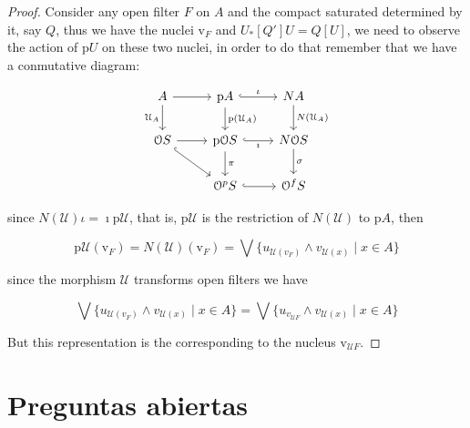 \documentclass[11pt]{amsart}
\theoremstyle{plain}
\theoremstyle{definition}
\begin{document}
\begin{proof}
Consider any open filter $F$ on $A$ and the compact saturated determined by it, say $Q$, 
thus we have the nuclei $\mathrm{v}_{F}$ and $U_{*}[Q']U=Q[U]$, we need to observe the action of 
$\mathrm{p}U$ on these two nuclei, in order to do that remember that we have a conmutative diagram:



\[\begin{tikzcd}
	A & \mathrm{p}A & NA \\
	{\mathcal{O}S} & {\mathrm{p}
	\mathcal{O}S} & {N\mathcal{O}S} \\
	& {\mathcal{O}^pS} & {\mathcal{O}^fS}
	\arrow[from=1-1, to=1-2]
	\arrow["{\mathcal{U}_A}"', from=1-1, to=2-1]
	\arrow["\iota",hook, from=1-2, to=1-3]
	\arrow["{\mathrm{p}(\mathcal{U}_A)}", from=1-2, to=2-2]
	\arrow["{N(\mathcal{U}_A)}", from=1-3, to=2-3]
	\arrow[from=2-1, to=2-2]
	\arrow[hook, from=2-1, to=3-2]
	\arrow["\imath "',hook, from=2-2, to=2-3]
	\arrow["\pi", from=2-2, to=3-2]
	\arrow["\sigma", from=2-3, to=3-3]
	\arrow[hook, from=3-2, to=3-3]
\end{tikzcd}\]

since $N(\mathcal{U})\iota=\imath\mathrm{p}\mathcal{U}$, that is, $\mathrm{p}\mathcal{U}$ 
is the restriction of $N(\mathcal{U})$ to $\mathrm{p}A$, then 

\[\mathrm{p}\mathcal{U}(\mathrm{v}_{F})=N(\mathcal{U})(\mathrm{v}_{F})=\bigvee\{u_{\mathcal{U}(v_{F})}\wedge v_{\mathcal{U}(x)}\mid x\in A \}\]

since the morphism $\mathcal{U}$ transforms open filters we have 



\[\bigvee\{u_{\mathcal{U}(v_{F})}\wedge v_{\mathcal{U}(x)}\mid x\in A \}=\bigvee\{u_{v_{\mathcal{U}F}}\wedge v_{\mathcal{U}(x)}\mid x\in A \}\]


But this representation is the corresponding to the nucleus $\mathrm{v}_{\mathcal{U}F}$.






\end{proof}









\section{Preguntas abiertas}
\end{document}
